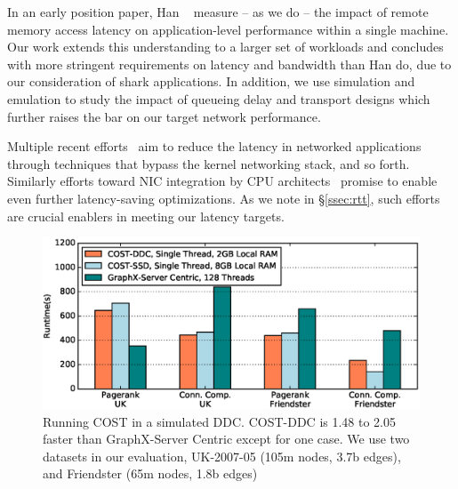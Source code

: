 
In an early position paper, Han \etal~\cite{hotnets} measure -- as we do -- the impact of remote memory access latency on application-level performance within a single machine. Our work extends this  understanding to a larger set of workloads and concludes with more stringent requirements on latency and bandwidth than Han \etal do, due to our consideration of shark applications. In addition, we use simulation and emulation to study the impact of queueing delay and transport designs which further raises the bar on our target network performance.


Multiple recent efforts~\cite{farm,mica,herd,ramcloud} aim to reduce the latency in networked applications through techniques that bypass the kernel networking stack, and so forth. %
Similarly efforts toward NIC integration by CPU architects~\cite{cpu-nic} promise to enable even further latency-saving optimizations. As we note in \S\ref{ssec:rtt}, such efforts are crucial enablers in meeting our latency targets. 










\begin{figure}
  \centering
    \includegraphics[width = \columnwidth]{img/benefit_uk.eps} 
  \caption{\small{Running COST in a simulated DDC. COST-DDC is 1.48 to 2.05 faster than GraphX-Server Centric except for one case. We use two datasets in our evaluation, UK-2007-05 (105m nodes, 3.7b edges), and Friendster (65m nodes, 1.8b edges)}}
  \label{fig:benefit}
\end{figure}







